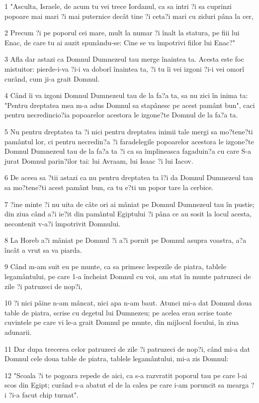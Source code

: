 \par 1 "Asculta, Israele, de acum tu vei trece Iordanul, ca sa intri ?i sa cuprinzi popoare mai mari ?i mai puternice decât tine ?i ceta?i mari cu ziduri pâna la cer,
\par 2 Precum ?i pe poporul cei mare, mult la numar ?i înalt la statura, pe fiii lui Enac, de care tu ai auzit spunându-se: Cine se va împotrivi fiilor lui Enac?"
\par 3 Afla dar astazi ca Domnul Dumnezeul tau merge înaintea ta. Acesta este foc mistuitor: pierde-i-va ?i-i va doborî înaintea ta, ?i tu îi vei izgoni ?i-i vei omorî curând, cum ji-a grait Domnul.
\par 4 Când îi va izgoni Domnul Dumnezeul tau de la fa?a ta, sa nu zici în inima ta: "Pentru dreptatea mea m-a adus Domnul sa stapânesc pe acest pamânt bun", caci pentru necredincio?ia popoarelor acestora le izgone?te Domnul de la fa?a ta.
\par 5 Nu pentru dreptatea ta ?i nici pentru dreptatea inimii tale mergi sa mo?tene?ti pamântul lor, ci pentru necredin?a ?i faradelegile popoarelor acestora le izgone?te Domnul Dumnezeul tau de la fa?a ta ?i ca sa împlineasca fagaduin?a cu care S-a jurat Domnul parin?ilor tai: lui Avraam, lui Isaac ?i lui Iacov.
\par 6 De aceea sa ?tii astazi ca nu pentru dreptatea ta î?i da Domnul Dumnezeul tau sa mo?tene?ti acest pamânt bun, ca tu e?ti un popor tare la cerbice.
\par 7 ?ine minte ?i nu uita de câte ori ai mâniat pe Domnul Dumnezeul tau în pustie; din ziua când a?i ie?it din pamântul Egiptului ?i pâna ce au sosit la locul acesta, necontenit v-a?i împotrivit Domnului.
\par 8 La Horeb a?i mâniat pe Domnul ?i a?i pornit pe Domnul asupra voastra, a?a încât a vrut sa va piarda.
\par 9 Când m-am suit eu pe munte, ca sa primesc lespezile de piatra, tablele legamântului, pe care 1-a încheiat Domnul cu voi, am stat în munte patruzeci de zile ?i patruzeci de nop?i,
\par 10 ?i nici pâine n-am mâncat, nici apa n-am baut. Atunci mi-a dat Domnul doua table de piatra, scrise cu degetul lui Dumnezeu; pe acelea erau scrise toate cuvintele pe care vi le-a grait Domnul pe munte, din mijlocul focului, în ziua adunarii.
\par 11 Dar dupa trecerea celor patruzeci de zile ?i patruzeci de nop?i, când mi-a dat Domnul cele doua table de piatra, tablele legamântului, mi-a zis Domnul:
\par 12 "Scoala ?i te pogoara repede de aici, ca s-a razvratit poporul tau pe care l-ai scos din Egipt; curând s-a abatut el de la calea pe care i-am poruncit sa mearga ?i ?i-a facut chip turnat".
